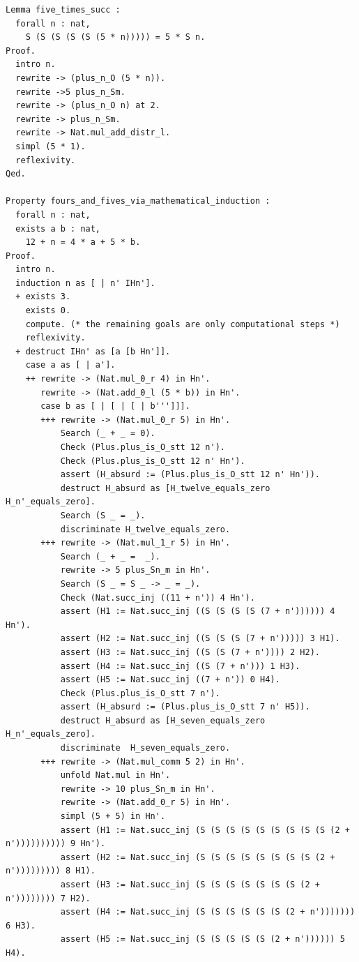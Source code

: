 \documentclass{article}
\begin{document}
\begin{lstlisting}
Lemma five_times_succ :
  forall n : nat,
    S (S (S (S (S (5 * n))))) = 5 * S n.
Proof.
  intro n.
  rewrite -> (plus_n_O (5 * n)).
  rewrite ->5 plus_n_Sm.
  rewrite -> (plus_n_O n) at 2.
  rewrite -> plus_n_Sm.
  rewrite -> Nat.mul_add_distr_l.
  simpl (5 * 1).
  reflexivity.
Qed.

Property fours_and_fives_via_mathematical_induction :
  forall n : nat,
  exists a b : nat,
    12 + n = 4 * a + 5 * b.
Proof.
  intro n.
  induction n as [ | n' IHn'].
  + exists 3.
    exists 0.
    compute. (* the remaining goals are only computational steps *)
    reflexivity.
  + destruct IHn' as [a [b Hn']].
    case a as [ | a'].
    ++ rewrite -> (Nat.mul_0_r 4) in Hn'. 
       rewrite -> (Nat.add_0_l (5 * b)) in Hn'.
       case b as [ | [ | [ | b''']]].
       +++ rewrite -> (Nat.mul_0_r 5) in Hn'.
           Search (_ + _ = 0).
           Check (Plus.plus_is_O_stt 12 n').
           Check (Plus.plus_is_O_stt 12 n' Hn').
           assert (H_absurd := (Plus.plus_is_O_stt 12 n' Hn')).
           destruct H_absurd as [H_twelve_equals_zero H_n'_equals_zero].
           Search (S _ = _).
           discriminate H_twelve_equals_zero.
       +++ rewrite -> (Nat.mul_1_r 5) in Hn'.
           Search (_ + _ =  _).
           rewrite -> 5 plus_Sn_m in Hn'.
           Search (S _ = S _ -> _ = _).
           Check (Nat.succ_inj ((11 + n')) 4 Hn').
           assert (H1 := Nat.succ_inj ((S (S (S (S (7 + n')))))) 4 Hn').
           assert (H2 := Nat.succ_inj ((S (S (S (7 + n'))))) 3 H1).
           assert (H3 := Nat.succ_inj ((S (S (7 + n')))) 2 H2).
           assert (H4 := Nat.succ_inj ((S (7 + n'))) 1 H3).
           assert (H5 := Nat.succ_inj ((7 + n')) 0 H4).
           Check (Plus.plus_is_O_stt 7 n').
           assert (H_absurd := (Plus.plus_is_O_stt 7 n' H5)).
           destruct H_absurd as [H_seven_equals_zero H_n'_equals_zero].
           discriminate  H_seven_equals_zero.
       +++ rewrite -> (Nat.mul_comm 5 2) in Hn'.
           unfold Nat.mul in Hn'.
           rewrite -> 10 plus_Sn_m in Hn'.           
           rewrite -> (Nat.add_0_r 5) in Hn'.
           simpl (5 + 5) in Hn'.
           assert (H1 := Nat.succ_inj (S (S (S (S (S (S (S (S (S (2 + n')))))))))) 9 Hn').
           assert (H2 := Nat.succ_inj (S (S (S (S (S (S (S (S (2 + n'))))))))) 8 H1).
           assert (H3 := Nat.succ_inj (S (S (S (S (S (S (S (2 + n')))))))) 7 H2).
           assert (H4 := Nat.succ_inj (S (S (S (S (S (S (2 + n'))))))) 6 H3).
           assert (H5 := Nat.succ_inj (S (S (S (S (S (2 + n')))))) 5 H4).

\end{lstlisting}
\end{document}
